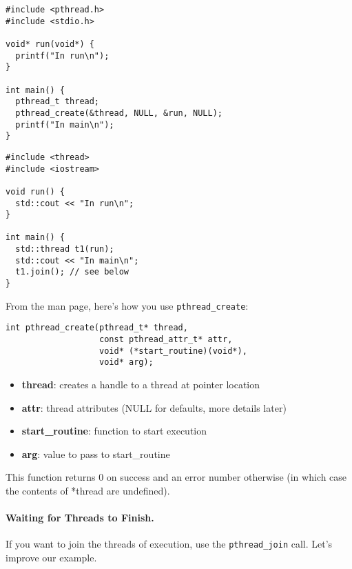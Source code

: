 {\small
  \begin{minipage}{.55\textwidth}
\begin{verbatim}
#include <pthread.h>
#include <stdio.h>

void* run(void*) {
  printf("In run\n");
}

int main() {
  pthread_t thread;
  pthread_create(&thread, NULL, &run, NULL);
  printf("In main\n");
}
\end{verbatim}
  \end{minipage} 
  \begin{minipage}{.4\textwidth}
\begin{verbatim}
#include <thread>
#include <iostream>

void run() {
  std::cout << "In run\n";
}

int main() {
  std::thread t1(run);
  std::cout << "In main\n";
  t1.join(); // see below
}
\end{verbatim}
  \end{minipage}
}

From the man page, here's how you use \verb+pthread_create+:
\begin{verbatim}
int pthread_create(pthread_t* thread, 
                   const pthread_attr_t* attr,
                   void* (*start_routine)(void*),
                   void* arg);
\end{verbatim}

\begin{itemize}
\item  {\bf thread}: creates a handle to a thread at pointer location

\item  {\bf attr}: thread attributes (NULL for defaults, more details later)

\item  {\bf start\_routine}: function to start execution

\item   {\bf arg}: value to pass to start\_routine
\end{itemize}

This function returns 0 on success and an error number otherwise (in
which case the contents of *thread are undefined).

\paragraph{Waiting for Threads to Finish.} If you want to join the threads
of execution, use the {\tt pthread\_join} call. Let's improve our example.

